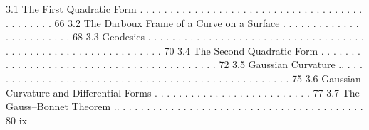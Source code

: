 \documentclass[a4paper,10pt]{article}
\begin{document}
3.1 The First Quadratic Form . . . . . . . . . . . . . . . . . . . . . . . . . . . . . . . . . . . . . . . . . . . . . 66
3.2 The Darboux Frame of a Curve on a Surface . . . . . . . . . . . . . . . . . . . . . . . . 68
3.3 Geodesics . . . . . . . . . . . . . . . . . . . . . . . . . . . . . . . . . . . . . . . . . . . . . . . . . . . . . . . . . . . . . . 70
3.4 The Second Quadratic Form . . . . . . . . . . . . . . . . . . . . . . . . . . . . . . . . . . . . . . . . . . 72
3.5 Gaussian Curvature .. . . . . . . . . . . . . . . . . . . . . . . . . . . . . . . . . . . . . . . . . . . . . . . . . . . 75
3.6 Gaussian Curvature and Differential Forms . . . . . . . . . . . . . . . . . . . . . . . . . . 77
3.7 The Gauss–Bonnet Theorem .. . . . . . . . . . . . . . . . . . . . . . . . . . . . . . . . . . . . . . . . . 80
ix
\end{document}
